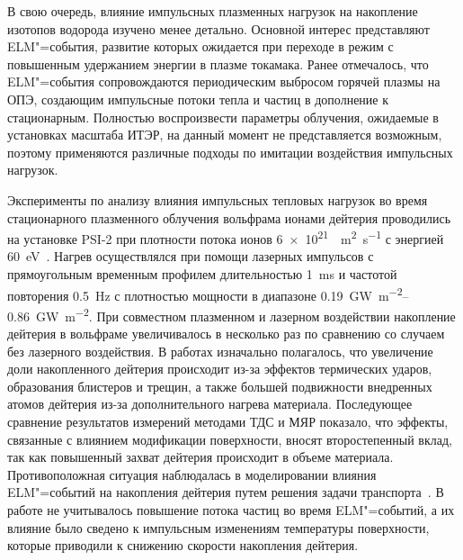В свою очередь, влияние импульсных плазменных нагрузок на накопление изотопов водорода изучено менее детально. Основной интерес представляют ELM"=события, развитие которых ожидается при переходе в режим с повышенным удержанием энергии в плазме токамака. Ранее отмечалось, что ELM"=события сопровождаются периодическим выбросом горячей плазмы на ОПЭ, создающим импульсные потоки тепла и частиц в дополнение к стационарным. Полностью воспроизвести параметры облучения, ожидаемые в установках масштаба ИТЭР, на данный момент не представляется возможным, поэтому применяются различные подходы по имитации воздействия импульсных нагрузок.

Эксперименты по анализу влияния импульсных тепловых нагрузок во время стационарного плазменного облучения вольфрама ионами дейтерия проводились на установке PSI-2 при плотности потока ионов \SI{6e21}{\per\meter\squared\per\second} с энергией \SI{60}{\electronvolt}~\cite{Huber2016_1, Huber2016_2}. Нагрев осуществлялся при помощи лазерных импульсов с прямоугольным временным профилем длительностью \SI{1}{\milli\second} и частотой повторения \SI{0.5}{\hertz} с плотностью мощности в диапазоне \SIrange{0.19}{0.86}{\giga\watt\per\meter\squared}. При совместном плазменном и лазерном воздействии накопление дейтерия в вольфраме увеличивалось в несколько раз по сравнению со случаем без лазерного воздействия. В работах изначально полагалось, что увеличение доли накопленного дейтерия происходит из-за эффектов термических ударов, образования блистеров и трещин, а также большей подвижности внедренных атомов дейтерия из-за дополнительного нагрева материала. Последующее сравнение результатов измерений методами ТДС и МЯР показало, что эффекты, связанные с влиянием модификации поверхности, вносят второстепенный вклад, так как повышенный захват дейтерия происходит в объеме материала. Противоположная ситуация наблюдалась в моделировании влияния ELM"=событий на накопления дейтерия путем решения задачи транспорта~\cite{Hu2015}. В работе не учитывалось повышение потока частиц во время ELM"=событий, а их влияние было сведено к импульсным изменениям температуры поверхности, которые приводили к снижению скорости накопления дейтерия.

